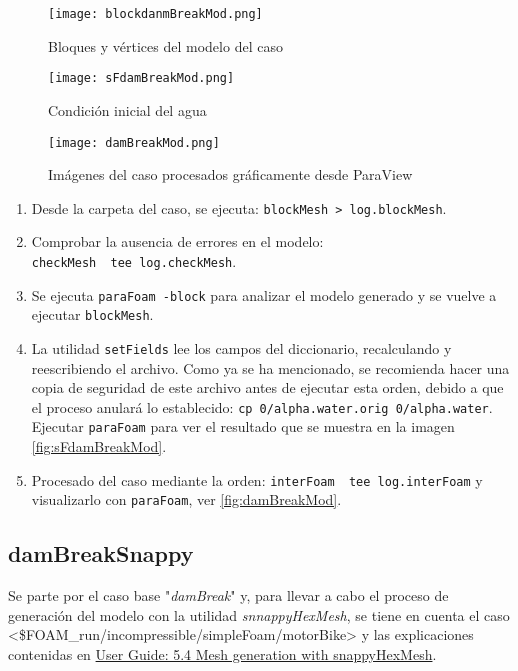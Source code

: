 \begin{figure}
\centering
\texttt{[image: blockdanmBreakMod.png]}
\caption{Bloques y vértices del modelo del caso}
\label{fig:blockdanmBreakMod}
\end{figure}

\begin{figure}
\centering
\texttt{[image: sFdamBreakMod.png]}
\caption{Condición inicial del agua}
\label{fig:sFdamBreakMod}
\end{figure}

\begin{figure}
\centering
\texttt{[image: damBreakMod.png]}
\caption{Imágenes del caso procesados gráficamente desde ParaView}
\label{fig:damBreakMod}
\end{figure}

\begin{enumerate}
\def\labelenumi{\arabic{enumi}.}
\item
  Desde la carpeta del caso, se ejecuta:
  \texttt{blockMesh\ \textgreater{}\ log.blockMesh}.
\item
  Comprobar la ausencia de errores en el modelo:
  \texttt{checkMesh\ \textbar{}\ tee\ log.checkMesh}.
\item
  Se ejecuta \texttt{paraFoam\ -block} para analizar el modelo generado
  y se vuelve a ejecutar \texttt{blockMesh}.
\item
  La utilidad \texttt{setFields} lee los campos del diccionario,
  recalculando y reescribiendo el archivo. Como ya se ha mencionado, se
  recomienda hacer una copia de seguridad de este archivo antes de
  ejecutar esta orden, debido a que el proceso anulará lo establecido:
  \texttt{cp\ 0/alpha.water.orig\ 0/alpha.water}. Ejecutar
  \texttt{paraFoam} para ver el resultado que se muestra en la imagen \autoref{fig:sFdamBreakMod}.


\item
  Procesado del caso mediante la orden:
  \texttt{interFoam\ \textbar{}\ tee\ log.interFoam} y visualizarlo con
  \texttt{paraFoam}, ver \autoref{fig:damBreakMod}.

\end{enumerate}

\subsection{damBreakSnappy}\label{header-n850}

Se parte por el caso base "\emph{damBreak}" y, para llevar a cabo el
proceso de generación del modelo con la utilidad \emph{snnappyHexMesh},
se tiene en cuenta el caso
\textless{}\$FOAM\_run/incompressible/simpleFoam/motorBike\textgreater{}
y las explicaciones contenidas en
\href{https://cfd.direct/openfoam/user-guide/snappyhexmesh/}{User Guide:
5.4 Mesh generation with snappyHexMesh}.

